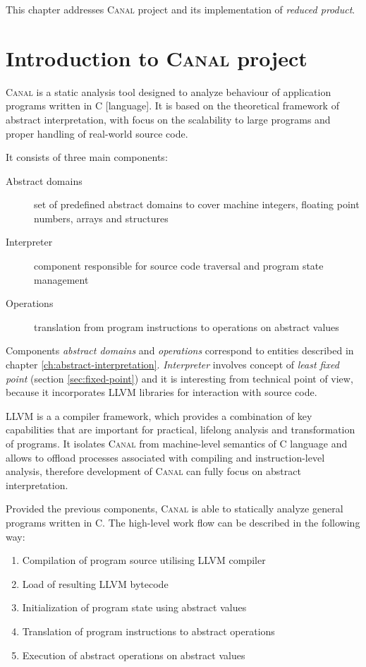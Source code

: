 \documentclass[12pt,oneside]{fithesis2}
\theoremstyle{definition}
\begin{document}
This chapter addresses \textsc{Canal} project and its implementation of \textit{reduced product}.

\section{Introduction to \textsc{Canal} project}

\textsc{Canal} is a static analysis tool designed to analyze behaviour of
application programs written in C [language]. It is based on the theoretical
framework of abstract interpretation, with focus on the scalability to
large programs and proper handling of real-world source code. \cite{Canal}

It consists of three main components:

\begin{description}
  \item[Abstract domains] set of predefined abstract domains to cover machine integers, floating point numbers, arrays and structures
  \item[Interpreter] component responsible for source code traversal and program state management
  \item[Operations] translation from program instructions to operations on abstract values
\end{description}

Components \textit{abstract domains} and \textit{operations} correspond to entities described in chapter \ref{ch:abstract-interpretation}. \textit{Interpreter} involves concept of \textit{least fixed point} (section \ref{sec:fixed-point}) and it is interesting from technical point of view, because it incorporates LLVM libraries for interaction with source code.

LLVM is a a compiler framework, which provides a combination of key capabilities that are important for practical, lifelong analysis and
transformation of programs. \cite{llvm} It isolates \textsc{Canal} from machine-level semantics of C language and allows to offload processes associated with compiling and instruction-level analysis, therefore development of \textsc{Canal} can fully focus on abstract interpretation.

Provided the previous components, \textsc{Canal} is able to statically analyze general programs written in C. The high-level work flow can be described in the following way:

\begin{enumerate}
  \item Compilation of program source utilising LLVM compiler
  \item Load of resulting LLVM bytecode
  \item Initialization of program state using abstract values
  \item Translation of program instructions to abstract operations
  \item Execution of abstract operations on abstract values
\end{enumerate}
\end{document}
